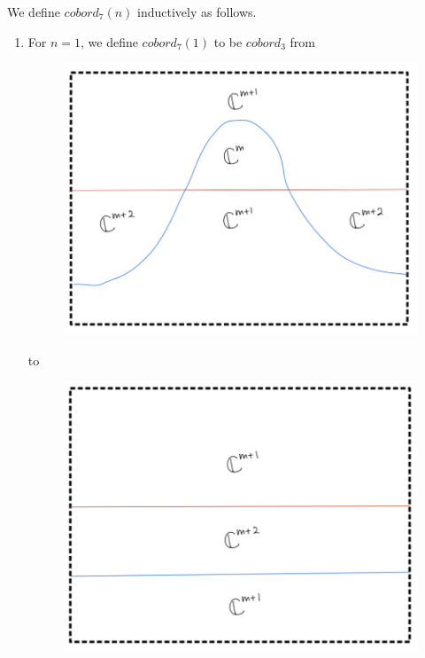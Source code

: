 We define $cobord_7(n)$ inductively as follows.
\begin{enumerate}[label=(\roman*)]
\item For $n=1$, we define $cobord_7(1)$ to be $cobord_3$ from
\begin{figure}[H]
    \centering
    \includegraphics[scale = 0.95]{diagrams/cobord7/2.png}
    \caption{}
    \label{fig:your-label}
\end{figure}
to
\begin{figure}[H]
    \centering
    \includegraphics[scale = 0.95]{diagrams/cobord7/3.png}
    \caption{}
    \label{fig:your-label}
\end{figure}


\end{enumerate}
